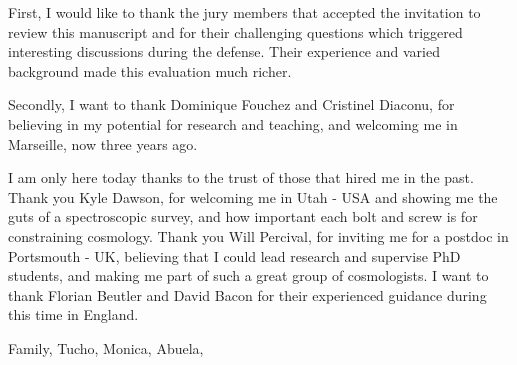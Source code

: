 

First, I would like to thank the jury members that accepted the invitation 
to review this manuscript and for their challenging questions which 
triggered interesting discussions during the defense. Their experience 
and varied background made this evaluation much richer. 

Secondly, I want to thank Dominique Fouchez and Cristinel Diaconu, 
for believing in my potential for research and teaching, and welcoming me 
in Marseille, now three years ago. 

I am only here today thanks to the trust of those that hired me in the past. 
Thank you Kyle Dawson, for welcoming me in Utah - USA and showing me the guts of 
a spectroscopic survey, and how important each bolt and screw is for constraining 
cosmology. Thank you Will Percival, for inviting me for a postdoc in Portsmouth - UK,
believing that I could lead research and supervise PhD students, and making me part of 
such a great group of cosmologists. I want to thank Florian Beutler and David Bacon 
for their experienced guidance during this time in England. 



Family, Tucho, Monica, Abuela, 


